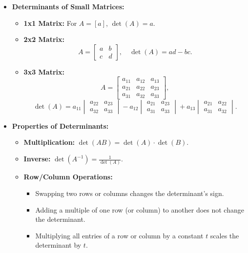 \documentclass{article}
\begin{document}
\begin{itemize}
  \item \textbf{Determinants of Small Matrices:}
    \begin{itemize}
      \item \textbf{1x1 Matrix:} For $A = [a]$, $\det(A) = a$.
      \item \textbf{2x2 Matrix:}
        \[
          A =
          \begin{bmatrix}
            a & b \\
            c & d
          \end{bmatrix},
          \quad
          \det(A) = ad - bc.
        \]
      \item \textbf{3x3 Matrix:}
        \[
          A =
          \begin{bmatrix}
            a_{11} & a_{12} & a_{13} \\
            a_{21} & a_{22} & a_{23} \\
            a_{31} & a_{32} & a_{33}
          \end{bmatrix},
        \]
        \[
          \det(A) = a_{11}
          \begin{vmatrix}
            a_{22} & a_{23} \\
            a_{32} & a_{33}
          \end{vmatrix}
          - a_{12}
          \begin{vmatrix}
            a_{21} & a_{23} \\
            a_{31} & a_{33}
          \end{vmatrix}
          + a_{13}
          \begin{vmatrix}
            a_{21} & a_{22} \\
            a_{31} & a_{32}
          \end{vmatrix}.
        \]
    \end{itemize}

  \item \textbf{Properties of Determinants:}
    \begin{itemize}
      \item \textbf{Multiplication:} $\det(AB) = \det(A) \cdot \det(B)$.
      \item \textbf{Inverse:} $\det(A^{-1}) = \frac{1}{\det(A)}$.
      \item \textbf{Row/Column Operations:}
        \begin{itemize}
          \item Swapping two rows or columns changes the determinant's sign.
          \item Adding a multiple of one row (or column) to another does not change the determinant.
          \item Multiplying all entries of a row or column by a constant $t$ scales the determinant by $t$.
        \end{itemize}
    \end{itemize}
\end{itemize}
\end{document}
